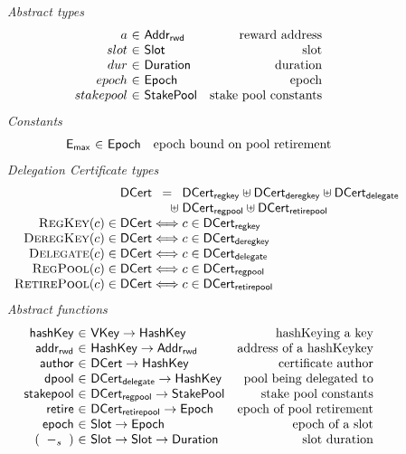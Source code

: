 \begin{figure}
  \emph{Abstract types}
  \begin{equation*}
    \begin{array}{r@{~\in~}lr}
      a & \AddrRWD & \text{reward address} \\
      slot & \Slot & \text{slot}\\
      dur & \Duration & \text{duration}\\
      epoch & \Epoch & \text{epoch} \\
      stakepool & \StakePool & \text{stake pool constants}
    \end{array}
  \end{equation*}
  \emph{Constants}
  \begin{equation*}
    \begin{array}{r@{~\in~}lr}
      \emax & \Epoch & \text{epoch bound on pool retirement}
    \end{array}
  \end{equation*}
  \emph{Delegation Certificate types}
  \begin{equation*}
  \begin{array}{r@{}c@{}l}
    \DCert &=& \DCertRegKey \uniondistinct \DCertDeRegKey \uniondistinct \DCertDeleg \\
                &\hfill\uniondistinct\;& \DCertRegPool \uniondistinct \DCertRetirePool \\
    \RegKey{c} \in \DCert &\iff& c \in \DCertRegKey \\
    \DeregKey{c} \in \DCert &\iff& c \in \DCertDeRegKey \\
    \Delegate{c} \in \DCert &\iff& c \in \DCertDeleg \\
    \RegPool{c} \in \DCert &\iff& c \in \DCertRegPool\\
    \RetirePool{c} \in \DCert &\iff& c \in \DCertRetirePool \\
  \end{array}
  \end{equation*}
  \emph{Abstract functions}
  \begin{equation*}
  \begin{array}{r@{~\in~}lr}
  \fun{hashKey} & \VKey \to \HashKey
  & \text{hashKeying a key}
  \\
  \fun{addr_{rwd}} & \HashKey \to \AddrRWD
  & \text{address of a hashKeykey}
  \\
  \fun{author} & \DCert \to \HashKey
  & \text{certificate author}
  \\
  \fun{dpool} & \DCertDeleg \to \HashKey
  & \text{pool being delegated to}
  \\
  \fun{stakepool} & \DCertRegPool \to \StakePool
  & \text{stake pool constants}
  \\
  \fun{retire} & \DCertRetirePool \to \Epoch
  & \text{epoch of pool retirement}
  \\
  \fun{epoch} & \Slot \to \Epoch
  & \text{epoch of a slot}
  \\
    (\slotminus{}{}) & \Slot \to \Slot \to \Duration
  & \text{slot duration}
  \end{array}
  \end{equation*}


\end{figure}
